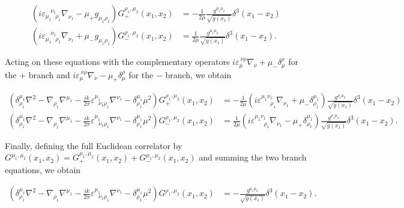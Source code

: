 \begin{align}
(i\varepsilon _{\mu_{1}~~~\rho_{1}}^{~~~~\nu_{1}}\nabla _{\nu_{1}}-\mu _{+}g_{\mu_{1}\rho_{1}})G_{+}^{\rho_{1},\mu_{2}}(x_{1},x_{2}) & =-\frac{1}{2\bar{\mu}} \frac{g^{\mu_{1}\mu_{2}}}{\sqrt{ g(x_{1}) }}\delta ^{3}(x_{1}-x_{2}) \\
(i\varepsilon _{\mu_{1}~~~\rho_{1}}^{~~~~\nu_{1}}\nabla _{\nu_{1}}+\mu _{-}g_{\mu_{1}\rho_{1}})G_{-}^{\rho_{1},\mu_{2}}(x_{1},x_{2}) & =\frac{1}{2\bar{\mu}} \frac{g^{\mu_{1}\mu_{2}}}{\sqrt{ g(x_{1}) }}\delta ^{3}(x_{1}-x_{2}).
\end{align}

Acting on these equations with the complementary operators $i\varepsilon _{\mu}^{~\nu \rho}\nabla _{\nu}+\mu_{-}\delta _{\mu}^{\rho}$ for the $+$ branch and $i\varepsilon _{\mu}^{~\nu \rho}\nabla _{\nu}-\mu_{+}\delta _{\mu}^{\rho}$ for the $-$ branch, we obtain

\begin{align}
\left( \delta _{\rho_{1}}^{\mu_{1}}\nabla ^{2}-\nabla _{\rho_{1}}\nabla ^{\mu_{1}}-\frac{ik}{2\pi}\varepsilon ^{\mu_{1}}_{~~~\nu_{1}\rho_{1}}\nabla ^{\nu_{1}}-\delta _{\rho_{1}}^{\mu_{1}}\mu ^{2} \right)G_{+}^{\rho_{1},\mu_{2}}(x_{1},x_{2})  & =-\frac{1}{2\bar{\mu}}\left(i\varepsilon ^{\mu_{1}\nu_{1}}_{~~~~~~~\rho_{1}}\nabla _{\nu_{1}}+\mu _{-}\delta ^{\mu_{1}}_{\rho_{1}}\right) \frac{g^{\rho_{1}\mu_{2}}}{\sqrt{ g(x_{1}) }} \delta ^{3}(x_{1}-x_{2}) \\
\left( \delta _{\rho_{1}}^{\mu_{1}}\nabla ^{2}-\nabla _{\rho_{1}}\nabla ^{\mu_{1}}-\frac{ik}{2\pi}\varepsilon ^{\mu_{1}}_{~~~\nu_{1}\rho_{1}}\nabla ^{\nu_{1}}-\delta _{\rho_{1}}^{\mu_{1}}\mu ^{2} \right)G_{-}^{\rho_{1},\mu_{2}}(x_{1},x_{2}) & =\frac{1}{2\bar{\mu}}\left(i\varepsilon ^{\mu_{1}\nu_{1}}_{~~~~~~~\rho_{1}}\nabla _{\nu_{1}}-\mu _{+}\delta ^{\mu_{1}}_{\rho_{1}}\right) \frac{g^{\rho_{1}\mu_{2}}}{\sqrt{ g(x_{1}) }} \delta ^{3}(x_{1}-x_{2}).
\end{align}

Finally, defining the full Euclidean correlator by $G^{\mu_{1},\mu_{2}}(x_{1},x_{2})=G_{+}^{\mu_{1},\mu_{2}}(x_{1},x_{2})+G_{-}^{\mu_{1},\mu_{2}}(x_{1},x_{2})$ and summing the two branch equations, we obtain

\begin{align}
\left( \delta _{\rho_{1}}^{\mu_{1}}\nabla ^{2}-\nabla _{\rho_{1}}\nabla ^{\mu_{1}}-\frac{ik}{2\pi}\varepsilon ^{\mu_{1}}_{~~~\nu_{1}\rho_{1}}\nabla ^{\nu_{1}}-\delta _{\rho_{1}}^{\mu_{1}}\mu ^{2} \right)G^{\rho_{1},\mu_{2}}(x_{1},x_{2}) & =-\frac{g^{\mu_{1}\mu_{2}}}{\sqrt{ g(x_{1}) }}\delta ^{3}(x_{1}-x_{2}).
\end{align}

